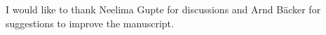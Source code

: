 \documentclass[reprint,amsmath,amssymb,aps,pre]{revtex4-1}
\begin{document}
\vspace*{0.3cm}

\begin{acknowledgments}
I would like to thank Neelima Gupte for discussions and Arnd B\"acker for 
suggestions to improve the manuscript.
\end{acknowledgments}




\appendix



%
%
%
%
%



\end{document}
